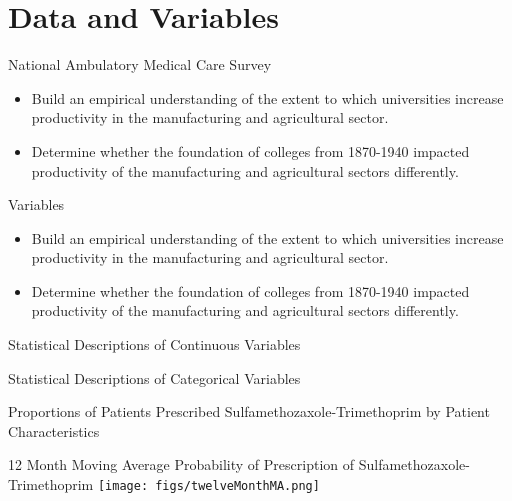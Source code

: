 \documentclass{beamer}
\begin{document}
\section{Data and Variables}
\begin{frame}{National Ambulatory Medical Care Survey}
\begin{itemize}
\item Build an empirical understanding of the extent to which  universities increase productivity in the manufacturing and agricultural sector.
\item Determine whether the foundation of colleges from 1870-1940 impacted productivity of the manufacturing and agricultural sectors differently.
\end{itemize}
\end{frame}

\begin{frame}{Variables}
\begin{itemize}
\item Build an empirical understanding of the extent to which  universities increase productivity in the manufacturing and agricultural sector.
\item Determine whether the foundation of colleges from 1870-1940 impacted productivity of the manufacturing and agricultural sectors differently.
\end{itemize}
\end{frame}

\begin{frame}{Statistical Descriptions of Continuous Variables}
\scalebox{.475}{}
\end{frame}

\begin{frame}{Statistical Descriptions of Categorical Variables}
\scalebox{.65}{}
\end{frame}

\begin{frame}{Proportions of Patients Prescribed Sulfamethozaxole-Trimethoprim by Patient Characteristics}
\begin{center}
\scalebox{.4}{}
\end{center}
\end{frame}

\begin{frame}{12 Month Moving Average Probability of Prescription of Sulfamethozaxole-Trimethoprim}
\texttt{[image: figs/twelveMonthMA.png]}
\end{frame}
\end{document}
